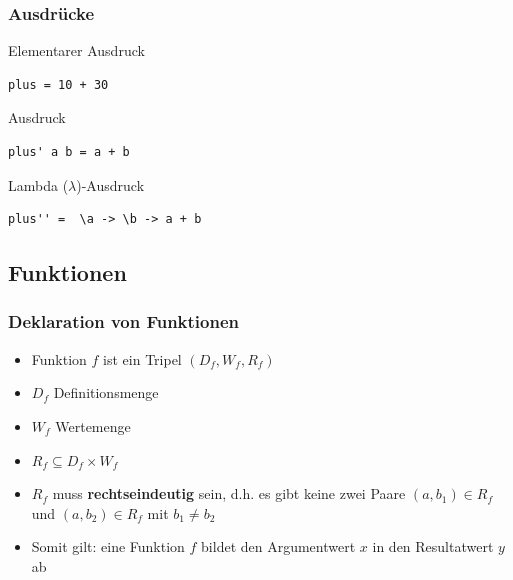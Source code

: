 \documentclass[fleqn,11pt,aspectratio=43]{beamer}
\begin{document}
\begin{frame}[fragile]
\frametitle{Ausdrücke} 
\begin{exampleblock}{Elementarer Ausdruck}
\begin{lstlisting}
plus = 10 + 30
\end{lstlisting}
\end{exampleblock}
\begin{exampleblock}{Ausdruck}
\begin{lstlisting}
plus' a b = a + b
\end{lstlisting}
\end{exampleblock}
\begin{exampleblock}{Lambda ($\lambda$)-Ausdruck}
\begin{lstlisting}
plus'' =  \a -> \b -> a + b
\end{lstlisting}
\end{exampleblock}
\end{frame}

\subsection{Funktionen}
\begin{frame}
\frametitle{Deklaration von Funktionen}
\begin{block}{\vspace*{-2ex}}
\begin{itemize}
  \item Funktion $f$ ist ein Tripel $(D_f, W_f, R_f)$
  \item $D_f$ Definitionsmenge
  \item $W_f$ Wertemenge
  \item $R_f \subseteq D_f \times W_f$
  \item $R_f$ muss \textbf{rechtseindeutig} sein, d.h. es gibt keine zwei Paare $(a,b_1) \in R_f$ und $(a,b_2) \in R_f$ mit $b_1 \neq b_2$
  \item Somit gilt: eine Funktion $f$ bildet den Argumentwert $x$ in den Resultatwert $y$ ab 
\end{itemize}
\end{block}
\end{frame}
\end{document}
